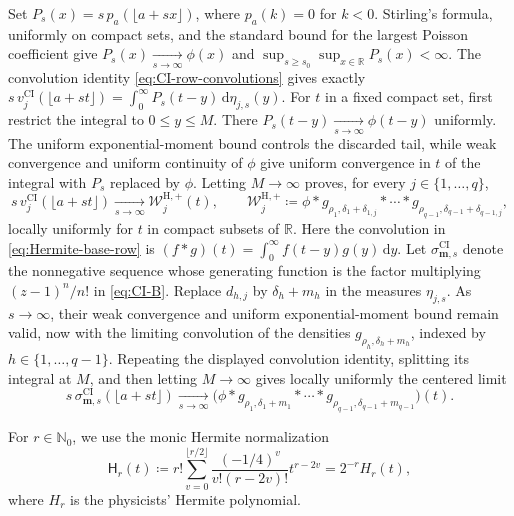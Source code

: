\documentclass[10pt]{amsart}
\newcommand{\Nzero}{\mathbb N_0}
\newcommand{\R}{\mathbb R}
\newcommand{\dd}{\,\mathrm d}
\newcommand{\mm}{\boldsymbol m}
\theoremstyle{plain}
\theoremstyle{definition}
\theoremstyle{remark}
\begin{document}
Set \(P_s(x)=s\,p_a(\lfloor a+sx\rfloor)\), where \(p_a(k)=0\) for
\(k<0\). Stirling's formula, uniformly on compact
sets, and the standard bound for the largest Poisson coefficient give
\(P_s(x)\xrightarrow[s\to\infty]{}\phi(x)\) and
\(\sup_{s\ge s_0}\sup_{x\in\R}P_s(x)<\infty\).
The convolution identity \eqref{eq:CI-row-convolutions} gives exactly
\(s\,v_j^{\mathrm{CI}}(\lfloor a+st\rfloor)
=\int_0^\infty P_s(t-y)\dd\eta_{j,s}(y)\).
For \(t\) in a fixed compact set, first restrict the integral to
\(0\le y\le M\). There
\(P_s(t-y)\xrightarrow[s\to\infty]{}\phi(t-y)\) uniformly. The uniform
exponential-moment bound controls the discarded tail, while weak
convergence and uniform continuity of \(\phi\) give uniform convergence in
\(t\) of the integral with \(P_s\) replaced by \(\phi\). Letting
\(M\to\infty\) proves, for every \(j\in\{1,\ldots,q\}\),
\begin{equation}
 s\,v_j^{\mathrm{CI}}(\lfloor a+st\rfloor)
 \xrightarrow[s\to\infty]{}\mathcal W_j^{\mathrm H,+}(t),
 \qquad
 \mathcal W_j^{\mathrm H,+}
 \coloneq\phi*g_{\rho_1,\delta_1+\delta_{1,j}}*\cdots *
 g_{\rho_{q-1},\delta_{q-1}+\delta_{q-1,j}},
 \label{eq:Hermite-base-row}
\end{equation}
locally uniformly for \(t\) in compact subsets of \(\R\). Here the
convolution in \eqref{eq:Hermite-base-row} is
\((f*g)(t)=\int_0^\infty f(t-y)g(y)\dd y\).
Let \(\sigma_{\mm,s}^{\mathrm{CI}}\) denote the nonnegative sequence
whose generating function is the factor multiplying
\((z-1)^n/n!\) in \eqref{eq:CI-B}.  Replace \(d_{h,j}\) by
\(\delta_h+m_h\) in the measures \(\eta_{j,s}\).  As \(s\to\infty\), their weak convergence
and uniform exponential-moment bound remain valid, now with the limiting
convolution of the densities \(g_{\rho_h,\delta_h+m_h}\), indexed by
\(h\in\{1,\ldots,q-1\}\).
Repeating the displayed
convolution identity, splitting its integral at \(M\), and then letting
\(M\to\infty\) gives locally uniformly the centered limit
\[
 s\,\sigma_{\mm,s}^{\mathrm{CI}}(\lfloor a+st\rfloor)
 \xrightarrow[s\to\infty]{}
 \bigl(\phi*g_{\rho_1,\delta_1+m_1}*\cdots *
 g_{\rho_{q-1},\delta_{q-1}+m_{q-1}}\bigr)(t).
\]

For \(r\in\Nzero\), we use the monic Hermite normalization
\begin{equation}
 \mathsf H_r(t)
 \coloneq r!\sum_{v=0}^{\lfloor r/2\rfloor}
 \frac{(-1/4)^v}{v!(r-2v)!}t^{r-2v}
 =2^{-r}H_r(t),
 \label{eq:monic-Hermite-definition}
\end{equation}
where \(H_r\) is the physicists' Hermite polynomial.
\end{document}
